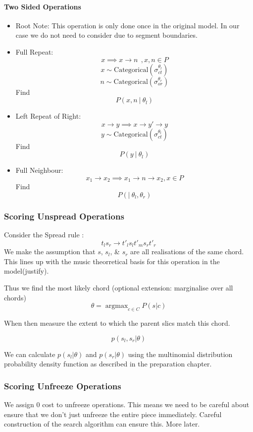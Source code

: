 \documentclass[12pt,a4paper,twoside,openright]{report}
\theoremstyle{definition}
\begin{document}
\paragraph{Two Sided Operations} 
\begin{itemize}
  \item Root Note: This operation is only done once in the original model. In our case we do not need to consider due to segment boundaries.
  \item Full Repeat: 
    \[ x \implies x \to n~~, x,n \in P \]
    \[x \sim \text{Categorical}(\sigma_{ct}^{\theta_l})\]
    \[n \sim \text{Categorical}(\sigma_{or}^{\theta_r})\]
    Find \[P(x,n~|~\theta_l)\]
  \item Left Repeat of Right: 
    \[ x \to y \implies x \to y' \to y \]
    \[y \sim \text{Categorical}(\sigma_{ct}^{\theta_l})\]
    Find \[P(y~|~\theta_l)\]
  \item Full Neighbour:
    \[ x_1 \to x_2 \implies x_1 \to n \to x_2, x \in P \]
    Find \[P(|~\theta_l,\theta_r)\]
\end{itemize}

\FloatBarrier
\subsubsection{Scoring Unspread Operations}

Consider the Spread rule : \[t_l s_r \to t'_l s_l t'_m s_r t'_r\]
We make the assumption that $s$, $s_l$, \& $s_r$ are all realisations of the same chord. This lines up with the music theorretical basis for this operation in the model(justify).
\par 
Thus we find the most likely chord (optional extension: marginalise over all chords)
\[\theta = \mathop{argmax}_{c \in C} P (s|c)\]
\par 
When then measure the extent to which the parent slics match this chord.

\[p(s_l, s_r| \theta)\]

We can calculate $p(s_l|\theta)$ and $p(s_r|\theta)$ using the multinomial distribution probability density function as described in the preparation chapter.

\FloatBarrier
\subsubsection{Scoring Unfreeze Operations}
We assign 0 cost to unfreeze operations. This means we need to be careful about ensure that we don't just unfreeze the entire piece immediately. Careful construction of the search algorithm can ensure this. More later.
\end{document}
